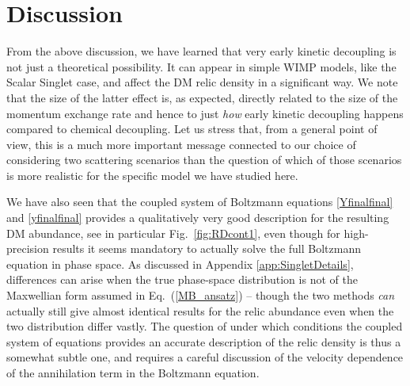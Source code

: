 \documentclass[twocolumn,showpacs,amsmath,amssymb,superscriptaddress,nofootinbib]{revtex4-1}
\begin{document}
\section{Discussion}
\label{sec:disc}

From the above discussion, we have learned that very early kinetic decoupling is not just
a theoretical possibility. It can appear in simple WIMP models, like the Scalar Singlet case,
and affect the DM relic density in a significant way. We note that the size of the latter effect is,
as expected, directly related to the size of the momentum exchange rate and hence to just
{\it how} early kinetic decoupling happens compared to chemical decoupling. Let us stress 
that,  from a  general point of view, this is 
a much more important message connected to our choice of considering two scattering scenarios
than the question of which of those scenarios is more realistic for the specific model we
have studied here.

We have also seen that the coupled system of Boltzmann equations \eqref{Yfinalfinal} and 
\eqref{yfinalfinal} provides a qualitatively very good description for the resulting DM
abundance, see in particular Fig.~\ref{fig:RDcont1}, even though for high-precision results it 
seems mandatory to actually solve
the full Boltzmann equation in phase space. As discussed in Appendix \ref{app:SingletDetails}, 
differences can arise when the true phase-space distribution is not of the Maxwellian form 
assumed in Eq.~(\ref{MB_ansatz}) -- though the two methods {\it can} actually still give almost 
identical results for the relic abundance even  when the two distribution differ vastly.
The question of under which conditions the coupled system of equations provides an accurate description
of the relic density is thus a somewhat subtle one, and requires a careful discussion of the velocity
dependence of the annihilation term in the Boltzmann equation.
\end{document}
